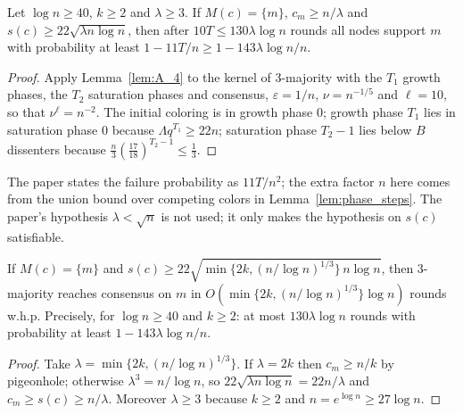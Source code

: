 \begin{theorem}\label{thm:3_8}
  \leanok
  Let $\log n \ge 40$, $k \ge 2$ and $\lambda \ge 3$. If $M(c) = \{m\}$,
  $c_m \ge n/\lambda$ and $s(c) \ge 22\sqrt{\lambda n\log n}$, then after
  $10T \le 130\lambda\log n$ rounds all nodes support $m$ with probability
  at least $1 - 11T/n \ge 1 - 143\lambda\log n/n$.
\end{theorem}

\begin{proof}
  Apply Lemma~\ref{lem:A_4} to the kernel of 3-majority with the $T_1$
  growth phases, the $T_2$ saturation phases and consensus,
  $\varepsilon = 1/n$, $\nu = n^{-1/5}$ and $\ell = 10$, so that
  $\nu^\ell = n^{-2}$. The initial coloring is in growth phase $0$; growth
  phase $T_1$ lies in saturation phase $0$ because $\Lambda q^{T_1} \ge 22n$;
  saturation phase $T_2 - 1$ lies below $B$ dissenters because
  $\frac n3(\frac{17}{18})^{T_2-1} \le \frac13$.
\end{proof}

\begin{remark}
  The paper states the failure probability as $11T/n^2$; the extra factor
  $n$ here comes from the union bound over competing colors in
  Lemma~\ref{lem:phase_steps}. The paper's
  hypothesis $\lambda < \sqrt n$ is not used; it only makes the hypothesis
  on $s(c)$ satisfiable.
\end{remark}

\begin{corollary}[Corollary 3.10]\label{cor:3_10}
  \leanok
  If $M(c) = \{m\}$ and
  $s(c) \ge 22\sqrt{\min\{2k, (n/\log n)^{1/3}\}\,n\log n}$, then 3-majority
  reaches consensus on $m$ in $O(\min\{2k, (n/\log n)^{1/3}\}\log n)$
  rounds w.h.p. Precisely, for $\log n \ge 40$ and $k \ge 2$: at most
  $130\lambda\log n$ rounds with probability at least
  $1 - 143\lambda\log n/n$.
\end{corollary}

\begin{proof}
  \leanok
  Take $\lambda = \min\{2k, (n/\log n)^{1/3}\}$. If $\lambda = 2k$ then
  $c_m \ge n/k$ by pigeonhole; otherwise $\lambda^3 = n/\log n$, so
  $22\sqrt{\lambda n\log n} = 22n/\lambda$ and $c_m \ge s(c) \ge n/\lambda$.
  Moreover $\lambda \ge 3$ because $k \ge 2$ and $n = e^{\log n} \ge 27\log n$.
\end{proof}

